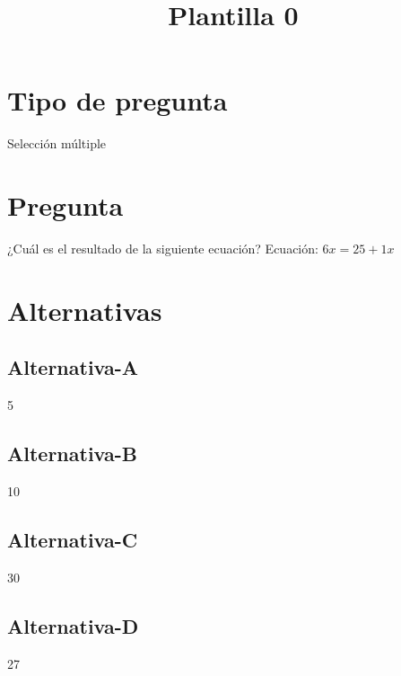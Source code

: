\documentclass{article}
\title{Plantilla 0}
\date{}
\begin{document}
\maketitle
\section*{Tipo de pregunta}
Selección múltiple
\section*{Pregunta}
¿Cuál es el resultado de la siguiente ecuación? Ecuación: $6x = 25 + 1x$
\section*{Alternativas}
\subsection*{Alternativa-A}
5
\subsection*{Alternativa-B}
10
\subsection*{Alternativa-C}
30
\subsection*{Alternativa-D}
27
\end{document}
